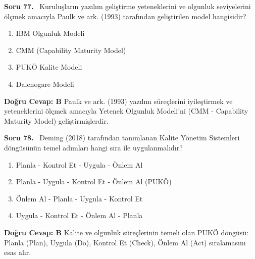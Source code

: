 \documentclass[11pt,a4paper,openany]{book}
\begin{document}
\needspace{5cm}
\vspace{8pt}
\noindent\textbf{\large\sffamily Soru 77.} \ Kuruluşların yazılım geliştirme yeteneklerini ve olgunluk seviyelerini ölçmek amacıyla Paulk ve ark. (1993) tarafından geliştirilen model hangisidir?
\begin{enumerate}[label=\Alph*), leftmargin=25pt, topsep=4pt, itemsep=2pt]
    \item IBM Olgunluk Modeli
    \item CMM (Capability Maturity Model)
    \item PUKÖ Kalite Modeli
    \item Dalenogare Modeli
\end{enumerate}
\vspace{4pt}
\begin{tcolorbox}[title=Cevap ve Açıklama, colback=gray!3!white, colframe=primarycolor!90!black, arc=2mm, fonttitle=\bfseries\sffamily, top=6pt, bottom=6pt]
    \textbf{Doğru Cevap: B}
    \vspace{2pt}
    Paulk ve ark. (1993) yazılım süreçlerini iyileştirmek ve yeteneklerini ölçmek amacıyla Yetenek Olgunluk Modeli'ni (CMM - Capability Maturity Model) geliştirmişlerdir.
\end{tcolorbox}
\vspace{10pt}

\needspace{5cm}
\vspace{8pt}
\noindent\textbf{\large\sffamily Soru 78.} \ Deming (2018) tarafından tanımlanan Kalite Yönetim Sistemleri döngüsünün temel adımları hangi sıra ile uygulanmalıdır?
\begin{enumerate}[label=\Alph*), leftmargin=25pt, topsep=4pt, itemsep=2pt]
    \item Planla - Kontrol Et - Uygula - Önlem Al
    \item Planla - Uygula - Kontrol Et - Önlem Al (PUKÖ)
    \item Önlem Al - Planla - Uygula - Kontrol Et
    \item Uygula - Kontrol Et - Önlem Al - Planla
\end{enumerate}
\vspace{4pt}
\begin{tcolorbox}[title=Cevap ve Açıklama, colback=gray!3!white, colframe=primarycolor!90!black, arc=2mm, fonttitle=\bfseries\sffamily, top=6pt, bottom=6pt]
    \textbf{Doğru Cevap: B}
    \vspace{2pt}
    Kalite ve olgunluk süreçlerinin temeli olan PUKÖ döngüsü: Planla (Plan), Uygula (Do), Kontrol Et (Check), Önlem Al (Act) sıralamasını esas alır.
\end{tcolorbox}
\vspace{10pt}
\end{document}
